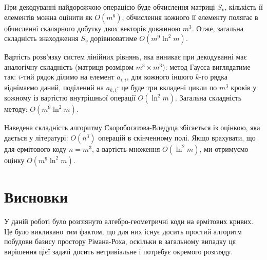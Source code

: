 \documentclass[a4paper,12pt,oneside]{article}
\begin{document}
При декодуванні найдорожчою операцією буде обчислення матриці $S_v$, кількість її елементів можна оцінити як $O(m^6)$, обчислення кожного її елементу полягає 
в обчисленні скалярного добутку двох векторів довжиною $m^3$. Отже, загальна складність знаходження $S_v$ дорівнюватиме $O(m^9 \ln^2 m)$.

Вартість розв'язку систем лінійних рівнянь, яка виникає при декодуванні має аналогічну складність (матриця розміром $m^3 \times m^3$): 
метод Гаусса виглядатиме так: $i$-тий рядок ділимо на елемент $a_{i,i}$, для кожного іншого $k$-го рядка віднімаємо даний, поділений на $a_{k,i}$:
це буде три вкладені цикли по $m^3$ кроків у кожному із вартістю внутрішньої операції $O(\ln^2 m)$. Загальна складність методу: $O(m^9 \ln^2 m)$.

Наведена складність алгоритму Скоробогатова-Вледуца збігається із оцінкою, яка дається у літературі: $O(n^3)$ операцій в скінченному полі. 
Якщо врахувати, що для ермітового коду $n=m^3$, а вартість множення $O(\ln^2 m)$, ми отримуємо оцінку $O(m^9 \ln^2 m)$.

\pagebreak
\section*{Висновки}
У даній роботі було розглянуто алгебро-геометричні коди на ермітових кривих. Це було викликано тим 
фактом, що для них існує досить простий алгоритм побудови базису простору Рімана-Роха, 
оскільки в загальному випадку ця вирішення цієї задачі досить нетривіальне і потребує 
окремого розгляду.

\nocite{*}

\clearpage
{}
{}

\end{document}

